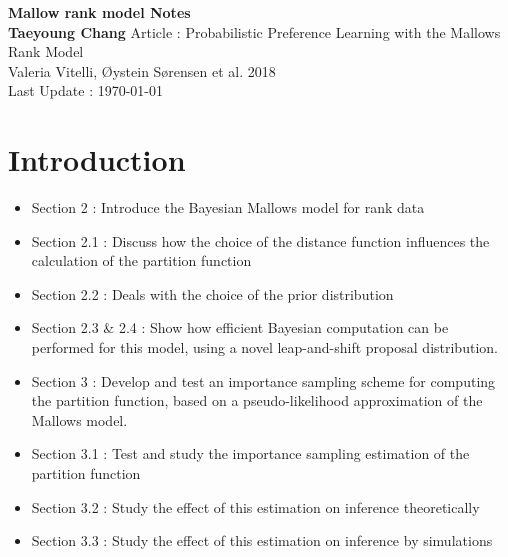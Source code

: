 \documentclass[12pt]{article}
\begin{document}
\begin{titlepage}
	\begin{center}
		\vspace*{5cm}
		\textbf{\Large Mallow rank model Notes}
		\\	
		\vspace{1.5cm}
		\textbf{Taeyoung Chang}
		\vfill
		Article : Probabilistic Preference Learning with the Mallows Rank Model
        \\ Valeria Vitelli, \O{}ystein S\o{}rensen et al. 2018
		\\
		\vspace{0.8cm}
		Last Update : \today
		\vspace*{3cm}
		\thispagestyle{empty}
	\end{center}
\end{titlepage}

\clearpage
	
\section{Introduction}
\begin{itemize}
    \item Section 2 : Introduce the Bayesian Mallows model for rank data
    \item Section 2.1 : Discuss how the choice of the distance function influences the calculation of the partition function
    \item Section 2.2 : Deals with the choice of the prior distribution
    \item Section 2.3 \& 2.4 : Show how efficient Bayesian computation can be performed for this model, using a novel leap-and-shift proposal distribution.
    \item Section 3 : Develop and test an importance sampling scheme for computing the partition function, based on a pseudo-likelihood approximation of the Mallows model.
    \item Section 3.1 : Test and study the importance sampling estimation of the partition function
    \item Section 3.2 : Study the effect of this estimation on inference theoretically
    \item Section 3.3 : Study the effect of this estimation on inference by simulations
\end{itemize}
\end{document}
